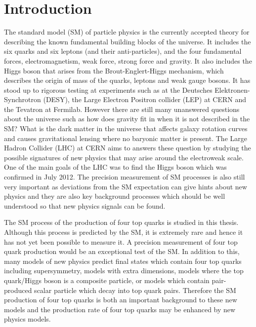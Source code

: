 \chapter{Introduction}
\label{c:intro}

The standard model (SM) of particle physics is the currently accepted theory for describing the known fundamental building blocks of the universe. It includes the six quarks and six leptons (and their anti-particles), and the four fundamental forces, electromagnetism, weak force, strong force and gravity. It also includes the Higgs boson that arises from the Brout-Englert-Higgs mechanism, which describes the origin of mass of the quarks, leptons and weak gauge bosons.
It has stood up to rigorous testing at experiments such as at the Deutsches Elektronen-Synchrotron (DESY), the Large Electron Positron collider (LEP) at CERN and the Tevatron at Fermilab. However there are still many unanswered questions about the universe such as how does gravity fit in when it is not described in the SM? What is the dark matter in the universe that affects galaxy rotation curves and causes gravitational lensing where no baryonic matter is present. 
The Large Hadron Collider (LHC) at CERN aims to answers these question by studying the possible signatures of new physics that may arise around the electroweak scale. One of the main goals of the LHC was to find the Higgs boson which was confirmed in July 2012. The precision measurement of SM processes is also still very important as deviations from the SM expectation can give hints about new physics and they are also key background processes which should be well understood so that new physics signals can be found.

The SM process of the production of four top quarks is studied in this thesis. Although this process is predicted by the SM, it is extremely rare and hence it has not yet been possible to measure it. A precision measurement of four top quark production would be an exceptional test of the SM. In addition to this, many models of new physics predict final states which contain four top quarks including supersymmetry, models with extra dimensions, models where the top quark/Higgs boson is a composite particle, or models which contain pair-produced scalar particle which decay into top quark pairs.
Therefore the SM production of four top quarks is both an important background to these new models and the production rate of four top quarks may be enhanced by new physics models.

